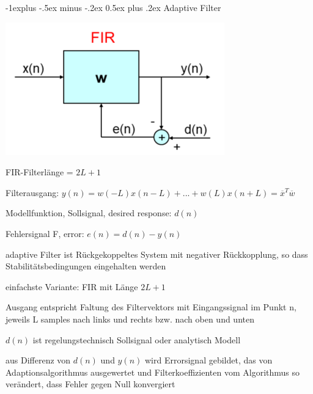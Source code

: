\documentclass[a4paper]{article}
\makeatletter
\renewcommand{\subsection}{\@startsection{subsection}{2}{0mm}%
 {-1explus -.5ex minus -.2ex}%
 {0.5ex plus .2ex}%
 {\normalfont\normalsize\bfseries}}
\makeatother
\begin{document}
\begin{multicols}{3}
  \subsection{Adaptive Filter}\label{adaptive-filter}
  \begin{center}
    \includegraphics[width=.45\linewidth]{Assets/Biosignalverarbeitung-adaptiv-fir.png}
  \end{center}
  \begin{itemize*}
    \item FIR-Filterlänge = $2L+1$
    \item Filterausgang: $y(n)=w(-L)x(n-L)+...+ w(L)x(n+L)= \overline{x}^T \overline{w}$
    \item Modellfunktion, Sollsignal, desired response: $d(n)$
    \item Fehlersignal F, error: $e(n)=d(n)-y(n)$
    \item adaptive Filter ist Rückgekoppeltes System mit negativer Rückkopplung, so dass Stabilitätsbedingungen eingehalten werden
    \item einfachste Variante: FIR mit Länge $2L+1$%
    \item Ausgang entspricht Faltung des Filtervektors mit Eingangssignal im Punkt n, jeweils L samples nach links und rechts bzw. nach oben und unten
    \item $d(n)$ ist regelungstechnisch Sollsignal oder analytisch Modell
    \item aus Differenz von $d(n)$ und $y(n)$ wird Errorsignal gebildet, das von Adaptionsalgorithmus ausgewertet und Filterkoeffizienten vom Algorithmus so verändert, dass Fehler gegen Null konvergiert

\end{itemize*}
\end{multicols}
\end{document}
